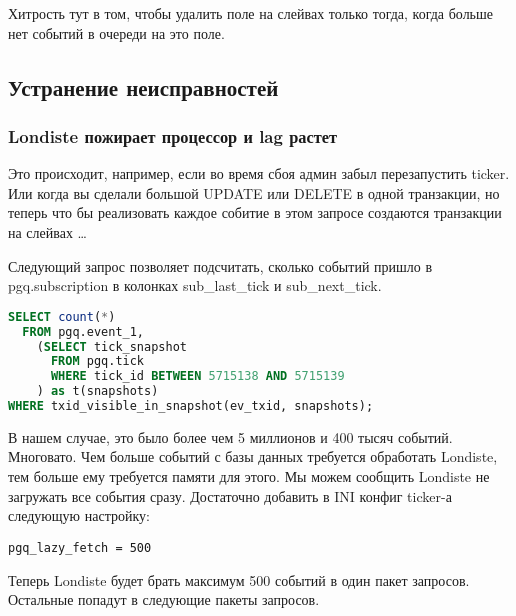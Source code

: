 Хитрость тут в том, чтобы удалить поле на слейвах только тогда, когда больше нет событий в очереди на это поле.


\subsection{Устранение неисправностей}

\subsubsection{Londiste пожирает процессор и lag растет}
Это происходит, например, если во время сбоя админ забыл перезапустить ticker. Или когда вы сделали большой 
UPDATE или DELETE в одной транзакции, но теперь что бы реализовать каждое собитие в этом запросе создаются 
транзакции на слейвах \dots

Следующий запрос позволяет подсчитать, сколько событий пришло в pgq.subscription в колонках sub\_last\_tick и sub\_next\_tick.
\begin{lstlisting}[language=SQL,label=lst:londiste24,caption=Устранение неисправностей]
SELECT count(*)
  FROM pgq.event_1,
    (SELECT tick_snapshot
      FROM pgq.tick
      WHERE tick_id BETWEEN 5715138 AND 5715139
    ) as t(snapshots)
WHERE txid_visible_in_snapshot(ev_txid, snapshots);
\end{lstlisting}

В нашем случае, это было более чем 5 миллионов и 400 тысяч событий. Многовато. Чем больше событий 
с базы данных требуется обработать Londiste, тем больше ему требуется памяти для этого. Мы можем сообщить 
Londiste не загружать все события сразу. Достаточно добавить в INI конфиг ticker-а следующую настройку:
\begin{lstlisting}[label=lst:londiste25,caption=Устранение неисправностей]
pgq_lazy_fetch = 500
\end{lstlisting}
 
Теперь Londiste будет брать максимум 500 событий в один пакет запросов. Остальные попадут в следующие пакеты запросов.